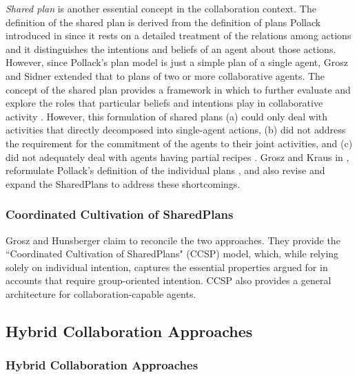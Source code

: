 \documentclass[11pt]{article}
\begin{document}
\textit{Shared plan} is another essential concept in the collaboration context.
The definition of the shared plan is derived from the definition of plans
Pollack introduced in \cite{pollack:plan-inference,
pollack:plan-mental-attitudes} since it rests on a detailed treatment of the
relations among actions and it distinguishes the intentions and beliefs of an
agent about those actions. However, since Pollack's plan model is just a simple
plan of a single agent, Grosz and Sidner extended that to plans of two or more
collaborative agents. The concept of the shared plan provides a framework in
which to further evaluate and explore the roles that particular beliefs and
intentions play in collaborative activity \cite{lochbaum:plan-models}. However,
this formulation of shared plans (a) could only deal with activities that
directly decomposed into single-agent actions, (b) did not address the
requirement for the commitment of the agents to their joint activities, and (c)
did not adequately deal with agents having partial recipes
\cite{grosz:collaboration}. Grosz and Kraus in \cite{grosz:collaboration},
reformulate Pollack's definition of the individual plans
\cite{pollack:plan-mental-attitudes}, and also revise and expand the SharedPlans
to address these shortcomings.

\subsubsection{Coordinated Cultivation of SharedPlans}

Grosz and Hunsberger \cite{grosz:ccsp} claim to reconcile the two approaches.
They provide the ``Coordinated Cultivation of SharedPlans" (CCSP) model, which,
while relying solely on individual intention, captures the essential properties
argued for in accounts that require group-oriented intention. CCSP also provides
a general architecture for collaboration-capable agents.

\subsection{Hybrid Collaboration Approaches}

\subsubsection{Hybrid Collaboration Approaches}
\end{document}
